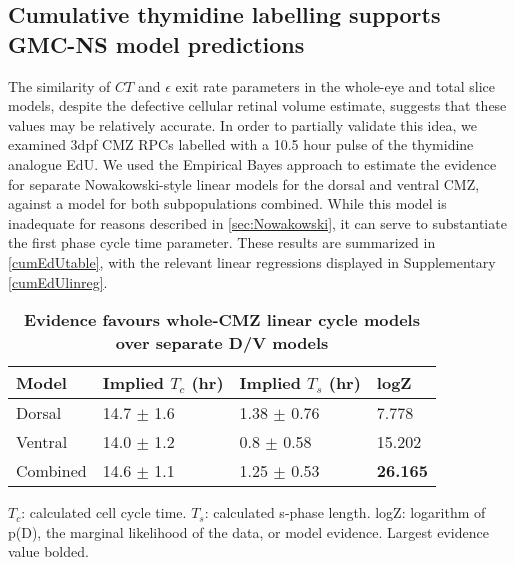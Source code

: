 \subsection{Cumulative thymidine labelling supports GMC-NS model predictions}

The similarity of $CT$ and $\epsilon$ exit rate parameters in the whole-eye and total slice models, despite the defective cellular retinal volume estimate, suggests that these values may be relatively accurate. In order to partially validate this idea, we examined 3dpf CMZ RPCs labelled with a 10.5 hour pulse of the thymidine analogue EdU. We used the Empirical Bayes approach to estimate the evidence for separate Nowakowski-style \cite{Nowakowski1989} linear models for the dorsal and ventral CMZ, against a model for both subpopulations combined. While this model is inadequate for reasons described in \autoref{sec:Nowakowski}, it can serve to substantiate the first phase cycle time parameter. These results are summarized in \autoref{cumEdUtable}, with the relevant linear regressions displayed in Supplementary \autoref{cumEdUlinreg}.

\begin{table}[!ht]
    \centering
    \caption{{\bf Evidence favours whole-CMZ linear cycle models over separate D/V models}}
    \begin{tabular}{|l|l|l|l|} 
        \hline {\bf Model} & {\bf Implied $T_c$ (hr)} & {\bf Implied $T_s$ (hr)} & {\bf logZ}\\
        \hline Dorsal & 14.7 $\pm$ 1.6 & 1.38 $\pm$ 0.76 & 7.778\\
        \hline Ventral & 14.0 $\pm$ 1.2 & 0.8 $\pm$ 0.58 & 15.202\\
        \hline Combined & 14.6 $\pm$ 1.1 & 1.25 $\pm$ 0.53 & {\bf26.165}\\ \hline
    \end{tabular}
   
    \begin{flushleft} $T_c$: calculated cell cycle time. $T_s$: calculated s-phase length. logZ: logarithm of p(D), the marginal likelihood of the data, or model evidence.  Largest evidence value bolded.
    \end{flushleft}
    \label{cumEdUtable}
\end{table}

